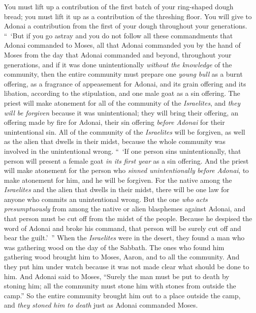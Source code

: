 \begin{biblechapter}
\verse You must lift up a contribution of the first batch of your ring-shaped dough bread; you must lift it up as a contribution of the threshing floor.
\verse You will give to Adonai a contribution from the first of your dough throughout your generations.
\verse “ ‘But if you go astray and you do not follow all these commandments that Adonai commanded to Moses,
\verse all that Adonai commanded you by the hand of Moses from the day that Adonai commanded and beyond, throughout your generations,
\verse and if it was done unintentionally \textit{without the knowledge} of the community, then the entire community must prepare one \textit{young bull} as a burnt offering, as a fragrance of appeasement for Adonai, and its grain offering and its libation, according to the stipulation, and one male goat as a sin offering.
\verse The priest will make atonement for all of the community of the \textit{Israelites}, and \textit{they will be forgiven} because it was unintentional; they will bring their offering, an offering made by fire for Adonai, their sin offering \textit{before Adonai} for their unintentional sin.
\verse All of the community of the \textit{Israelites} will be forgiven, as well as the alien that dwells in their midst, because the whole community was involved in the unintentional wrong.
\verse “ ‘If one person sins unintentionally, that person will present a female goat \textit{in its first year} as a sin offering.
\verse And the priest will make atonement for the person who \textit{sinned unintentionally} \textit{before Adonai}, to make atonement for him, and he will be forgiven.
\verse For the native among the \textit{Israelites} and the alien that dwells in their midst, there will be one law for anyone who commits an unintentional wrong.
\verse But the one \textit{who acts presumptuously} from among the native or alien blasphemes against Adonai, and that person must be cut off from the midst of the people.
\verse Because he despised the word of Adonai and broke his command, that person will be surely cut off and bear the guilt.’ ”
 When the \textit{Israelites} were in the desert, they found a man who was gathering wood on the day of the Sabbath.
\verse The ones who found him gathering wood brought him to Moses, Aaron, and to all the community.
\verse And they put him under watch because it was not made clear what should be done to him.
\verse And Adonai said to Moses, “Surely the man must be put to death by stoning him; all the community must stone him with stones from outside the camp.”
\verse So the entire community brought him out to a place outside the camp, and \textit{they stoned him to death} just as Adonai commanded Moses.

\end{biblechapter}
